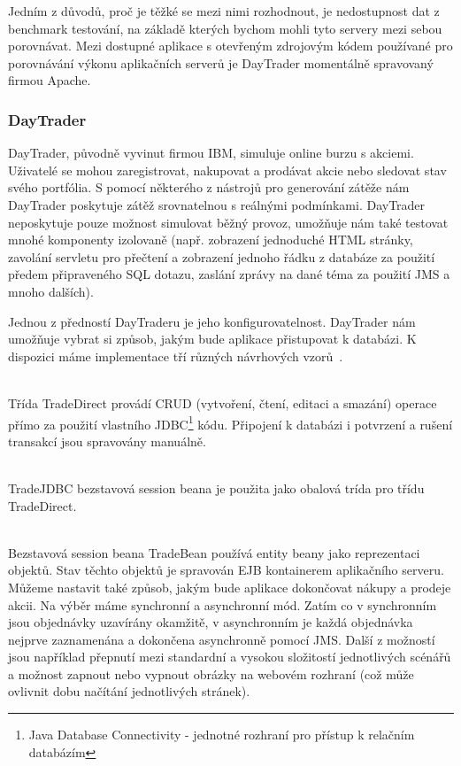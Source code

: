 \documentclass[122pt,oneside]{fithesis}
\begin{document}
Jedním z důvodů, proč je těžké se mezi nimi rozhodnout, je nedostupnost dat z benchmark testování, na základě kterých bychom mohli tyto servery mezi sebou porovnávat. Mezi dostupné aplikace s otevřeným zdrojovým kódem používané pro porovnávání výkonu aplikačních serverů je DayTrader momentálně spravovaný firmou Apache. 

\subsubsection{DayTrader}
DayTrader, původně vyvinut firmou IBM, simuluje online burzu s akciemi. Uživatelé se mohou zaregistrovat, nakupovat a prodávat akcie nebo sledovat stav svého portfólia. S pomocí některého z nástrojů pro generování zátěže nám DayTrader poskytuje zátěž srovnatelnou s reálnými podmínkami. DayTrader neposkytuje pouze možnost simulovat běžný provoz, umožňuje nám také testovat mnohé komponenty izolovaně (např. zobrazení jednoduché HTML stránky, zavolání servletu pro přečtení a zobrazení jednoho řádku z databáze za použití předem připraveného SQL dotazu, zaslání zprávy na dané téma za použití JMS a mnoho dalších). 

Jednou z předností DayTraderu je jeho konfigurovatelnost. DayTrader nám umožňuje vybrat si způsob, jakým bude aplikace přistupovat k databázi. K dispozici máme implementace tří různých návrhových vzorů~\cite{daytrader}.

\vspace{5 mm}
\\\indent Třída TradeDirect provádí CRUD (vytvoření, čtení, editaci a smazání) operace přímo za použití vlastního JDBC\footnote[1]{Java Database Connectivity - jednotné rozhraní pro přístup k relačním databázím} kódu. Připojení k databázi i potvrzení a rušení transakcí jsou spravovány manuálně.

\vspace{5 mm}
\\\indent TradeJDBC bezstavová session beana je použita jako obalová trída pro třídu TradeDirect.

\vspace{5 mm}
\\\indent Bezstavová session beana TradeBean používá entity beany jako reprezentaci objektů. Stav těchto objektů je spravován EJB kontainerem aplikačního serveru.
\newline
\\\indent Můžeme nastavit také způsob, jakým bude aplikace dokončovat nákupy a prodeje akcii. Na výběr máme synchronní a asynchronní mód. Zatím co v synchronním jsou objednávky uzavírány okamžitě, v asynchronním je každá objednávka nejprve zaznamenána a dokončena asynchronně pomocí JMS. Další z možností jsou například přepnutí mezi standardní a vysokou složitostí jednotlivých scénářů a možnost zapnout nebo vypnout obrázky na webovém rozhraní (což může ovlivnit dobu načítání jednotlivých stránek).
\end{document}
